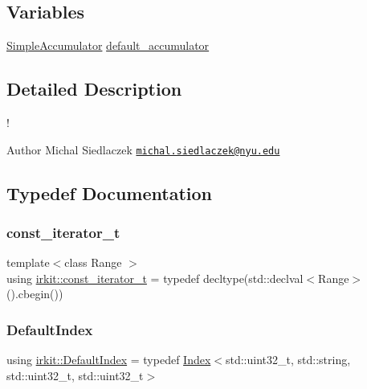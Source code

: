 \subsection*{Variables}
\begin{DoxyCompactItemize}
\item 
\hyperlink{classirkit_1_1SimpleAccumulator}{Simple\+Accumulator} \hyperlink{namespaceirkit_a823671564bf545991e9708011e4a8df1}{default\+\_\+accumulator}
\end{DoxyCompactItemize}


\subsection{Detailed Description}
! \begin{DoxyAuthor}{Author}
Michal Siedlaczek \href{mailto:michal.siedlaczek@nyu.edu}{\tt michal.\+siedlaczek@nyu.\+edu} 
\end{DoxyAuthor}


\subsection{Typedef Documentation}
\mbox{\label{namespaceirkit_a4b1668583041117eb42c1b5a1091b804}} 
\subsubsection{\texorpdfstring{const\+\_\+iterator\+\_\+t}{const\_iterator\_t}}
{\footnotesize\ttfamily template$<$class Range $>$ \\
using \hyperlink{namespaceirkit_a4b1668583041117eb42c1b5a1091b804}{irkit\+::const\+\_\+iterator\+\_\+t} = typedef decltype(std\+::declval$<$Range$>$().cbegin())}

\mbox{\label{namespaceirkit_a6f3d282716b38521a43b65100a6d337b}} 
\subsubsection{\texorpdfstring{Default\+Index}{DefaultIndex}}
{\footnotesize\ttfamily using \hyperlink{namespaceirkit_a6f3d282716b38521a43b65100a6d337b}{irkit\+::\+Default\+Index} = typedef \hyperlink{classirkit_1_1Index}{Index}$<$std\+::uint32\+\_\+t, std\+::string, std\+::uint32\+\_\+t, std\+::uint32\+\_\+t$>$}


